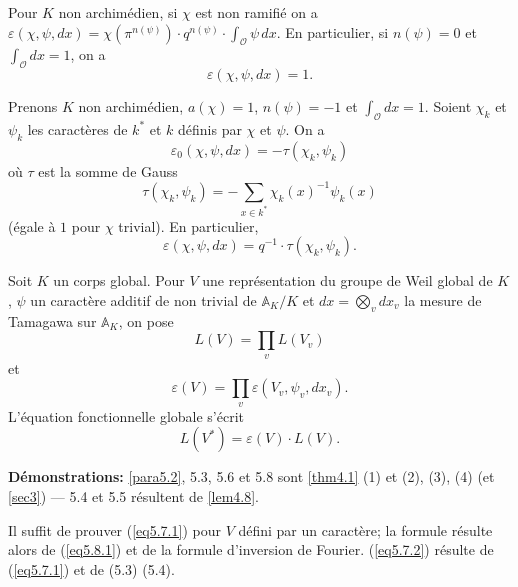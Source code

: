 \documentclass[11pt,a4paper]{amsart}
\theoremstyle{plain}
\theoremstyle{definition}
\newcommand{\dbA}{\mathbb{A}}
\newenvironment{para}{\par\noindent}{\par}
\newcommand{\scrO}{\mathscr{O}}
\newcommand{\eps}{\varepsilon}
\begin{document}
\begin{para}
Pour $K$ non archim\'edien, si $\chi$ est non ramifi\'e on a $\eps(\chi,\psi,dx) = \chi(\pi^{n(\psi)}) \cdot q^{n(\psi)} \cdot \int_{\scrO} \psi\, dx$. En particulier, si $n(\psi) = 0$ et $\int_{\scrO} dx = 1$, on a
\[
\eps(\chi,\psi,dx) = 1.
\]
\end{para}

\begin{para}
Prenons $K$ non archim\'edien, $a(\chi) = 1$, $n(\psi) = -1$ et $\int_{\scrO} dx = 1$. Soient $\chi_{k}$ et $\psi_{k}$ les caract\`eres de $k^{*}$ et $k$ d\'efinis par $\chi$ et $\psi$. On a
\begin{equation}\label{eq5.10.1}
\eps_{0}(\chi,\psi,dx) = -\tau(\chi_{k},\psi_{k})
\end{equation}
o\`u $\tau$ est la somme de Gauss
\begin{equation}\label{eq5.10.2}
\tau(\chi_{k},\psi_{k}) = -\sum_{x \in k^{*}} \chi_{k}(x)^{-1} \psi_{k}(x)
\end{equation}
(\'egale \`a $1$ pour $\chi$ trivial). En particulier,
\begin{equation}\label{eq5.10.3}
\eps(\chi,\psi,dx) = q^{-1} \cdot \tau(\chi_{k},\psi_{k}).
\end{equation}
\end{para}

\begin{para}
Soit $K$ un corps global. Pour $V$ une repr\'esentation du groupe de Weil global de $K$, $\psi$ un caract\`ere additif de non trivial de $\dbA_{K}/K$ et $dx = \bigotimes_{v} dx_{v}$ la mesure de Tamagawa sur $\dbA_{K}$, on pose
\begin{equation}
L(V) = \prod_{v} L(V_{v})
\end{equation}
et
\begin{equation}
\eps(V) = \prod_{v} \eps(V_{v}, \psi_{v}, dx_{v}).
\end{equation}
L'\'equation fonctionnelle globale s'\'ecrit
\begin{equation}
L(V^{*}) = \eps(V) \cdot L(V).
\end{equation}
\end{para}

\noindent
\textbf{D\'emonstrations:} \ref{para5.2}, 5.3, 5.6 et 5.8 sont \ref{thm4.1} (1) et (2), (3), (4) (et \ref{sec3}) --- 5.4 et 5.5 r\'esultent de \ref{lem4.8}.

Il suffit de prouver (\ref{eq5.7.1}) pour $V$ d\'efini par un caract\`ere; la formule r\'esulte alors de (\ref{eq5.8.1}) et de la formule d'inversion de Fourier. (\ref{eq5.7.2}) r\'esulte de (\ref{eq5.7.1}) et de (5.3) (5.4).
\end{document}

